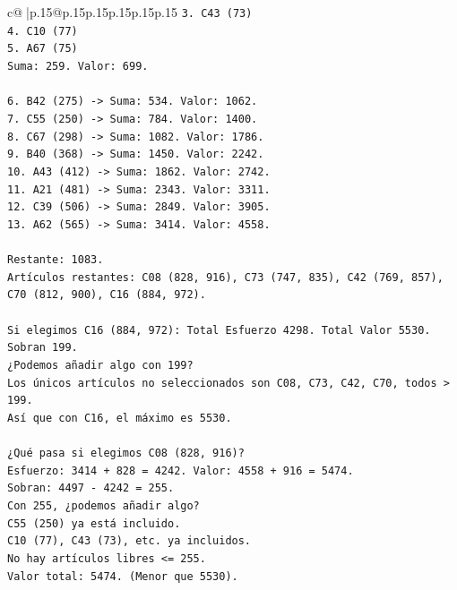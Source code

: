\documentclass{article}
\begin{document}
{\begin{supertabular}{c@{$\;$}|p{.15\linewidth}@{}p{.15\linewidth}p{.15\linewidth}p{.15\linewidth}p{.15\linewidth}p{.15\linewidth}}
{{{\texttt{3. C43 (73)} \\
\texttt{4. C10 (77)} \\
\texttt{5. A67 (75)} \\
\texttt{Suma: 259. Valor: 699.} \\
\\ 
\texttt{6. B42 (275) {-}> Suma: 534. Valor: 1062.} \\
\texttt{7. C55 (250) {-}> Suma: 784. Valor: 1400.} \\
\texttt{8. C67 (298) {-}> Suma: 1082. Valor: 1786.} \\
\texttt{9. B40 (368) {-}> Suma: 1450. Valor: 2242.} \\
\texttt{10. A43 (412) {-}> Suma: 1862. Valor: 2742.} \\
\texttt{11. A21 (481) {-}> Suma: 2343. Valor: 3311.} \\
\texttt{12. C39 (506) {-}> Suma: 2849. Valor: 3905.} \\
\texttt{13. A62 (565) {-}> Suma: 3414. Valor: 4558.} \\
\\ 
\texttt{Restante: 1083.} \\
\texttt{Artículos restantes: C08 (828, 916), C73 (747, 835), C42 (769, 857), C70 (812, 900), C16 (884, 972).} \\
\\ 
\texttt{Si elegimos C16 (884, 972): Total Esfuerzo 4298. Total Valor 5530. Sobran 199.} \\
\texttt{¿Podemos añadir algo con 199?} \\
\texttt{Los únicos artículos no seleccionados son C08, C73, C42, C70, todos > 199.} \\
\texttt{Así que con C16, el máximo es 5530.} \\
\\ 
\texttt{¿Qué pasa si elegimos C08 (828, 916)?} \\
\texttt{Esfuerzo: 3414 + 828 = 4242. Valor: 4558 + 916 = 5474.} \\
\texttt{Sobran: 4497 {-} 4242 = 255.} \\
\texttt{Con 255, ¿podemos añadir algo?} \\
\texttt{C55 (250) ya está incluido.} \\
\texttt{C10 (77), C43 (73), etc. ya incluidos.} \\
\texttt{No hay artículos libres <= 255.} \\
\texttt{Valor total: 5474. (Menor que 5530).} \\
\\ 
}}}
\end{supertabular}}
\end{document}
